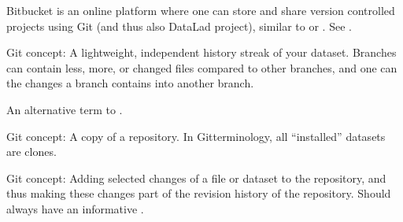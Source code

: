 \begin{description}
\ignorespaces 
\sphinxAtStartPar
Bitbucket is an online platform where one can store and share version
controlled projects using Git (and thus also DataLad project), similar
to {\hyperref[\detokenize{glossary:term-GitHub}]{}} or {\hyperref[\detokenize{glossary:term-GitLab}]{}}. See .

\ignorespaces 
\sphinxAtStartPar
Git concept: A lightweight, independent history streak of your dataset. Branches can contain less,
more, or changed files compared to other branches, and one can {\hyperref[\detokenize{glossary:term-merge}]{}} the changes
a branch contains into another branch.

\ignorespaces 
\sphinxAtStartPar
An alternative term to {\hyperref[\detokenize{glossary:term-shasum}]{}}.

\ignorespaces 
\sphinxAtStartPar
Git concept: A copy of a {\hyperref[\detokenize{glossary:term-Git}]{}} repository. In Git\sphinxhyphen{}terminology, all “installed” datasets
are clones.

\ignorespaces 
\sphinxAtStartPar
Git concept: Adding selected changes of a file or dataset to the repository, and thus making these changes
part of the revision history of the repository. Should always have an informative {\hyperref[\detokenize{glossary:term-commit-message}]{}}.


\end{description}

